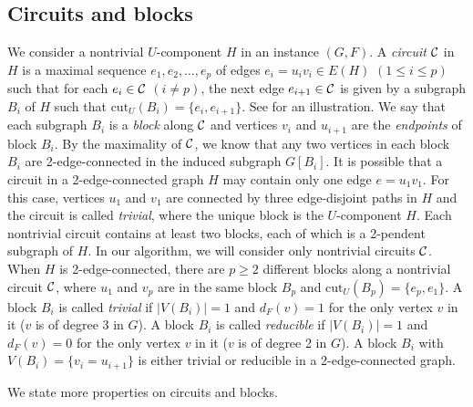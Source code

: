 \documentclass[runningheads]{llncs}
\begin{document}
\subsection{Circuits and blocks}
We consider a nontrivial $U$-component $H$ in an instance $(G,F)$.
A {\em circuit} ${\cal C}$ in $H$ is a maximal sequence
$e_1,e_2,\ldots ,e_p$ of edges $e_i=u_iv_i\in E(H)$ $(1\leq i\leq p)$
such that for each $e_{i}\in {\cal C}$ $(i\neq p)$,
the next edge $e_{i+1}\in {\cal C}$ is given
by a subgraph $B_i$ of $H$ such that
$\mathrm{cut}_U(B_i)=\{e_i,e_{i+1}\}$. See  for an illustration.
We say that each subgraph $B_i$ is a \emph{block} along ${\cal C}$ and vertices $v_i$ and $u_{i+1}$ are the {\em endpoints} of block $B_i$.
By the maximality of ${\cal C}$, we know that any two vertices in each block $B_i$ are 2-edge-connected in the induced subgraph $G[B_i]$. It is possible that a circuit in a 2-edge-connected graph $H$ may contain only one edge $e=u_1v_1$. For this case, vertices $u_1$ and $v_1$ are connected by three edge-disjoint paths in $H$ and the circuit is called \emph{trivial}, where the unique block is the $U$-component $H$.
Each nontrivial circuit contains at least two blocks, each of which is a 2-pendent subgraph of $H$.
In our algorithm, we will consider only nontrivial circuits ${\cal C}$.
When $H$ is 2-edge-connected, there are $p\geq 2$ different blocks along a nontrivial circuit ${\cal C}$, where  $u_1$ and $v_p$ are in the same block $B_p$ and $\mathrm{cut}_U(B_p)=\{e_p,e_{1}\}$.
A block $B_i$ is called {\em trivial} if $|V(B_i)|=1$ and $d_F(v)=1$ for the only vertex $v$ in it ($v$ is of degree 3 in $G$).
A block $B_i$ is called {\em reducible} if $|V(B_i)|=1$ and $d_F(v)=0$ for the only vertex $v$ in it ($v$ is of degree 2 in $G$).
A block $B_i$ with $V(B_i)=\{v_i=u_{i+1}\}$ is either trivial or reducible in a  2-edge-connected graph.

\vspace{-0mm}\vspace{-0mm}
We state more properties on circuits and blocks.


\end{document}
